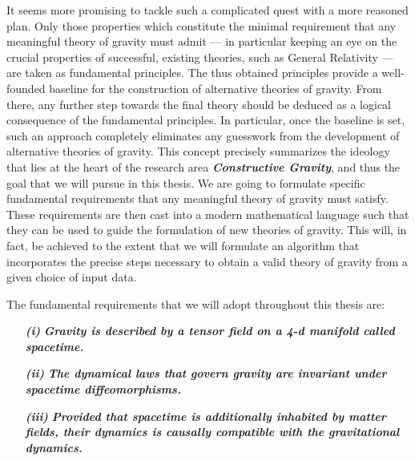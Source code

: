 It seems more promising to tackle such a complicated quest with a more reasoned plan. Only those properties which constitute the minimal requirement that any meaningful theory of gravity must admit --- in particular keeping an eye on the crucial properties of successful, existing theories, such as General Relativity --- are taken as fundamental principles. The thus obtained principles  provide a well-founded baseline for the construction of alternative theories of gravity. From there, any further step towards the final theory should be deduced as a logical consequence of the fundamental principles. In particular, once the baseline is set, such an approach completely eliminates any guesswork from the development of alternative theories of gravity. 
This concept precisely summarizes the ideology that lies at the heart of the research area \textit{\textbf{Constructive Gravity}}, and thus the goal that we will pursue in this thesis.
We are going to formulate specific fundamental requirements that any meaningful theory of gravity must satisfy. These requirements are then cast into a modern mathematical language such that they can be used to guide the formulation of new theories of gravity. This will, in fact, be achieved to the extent that we will formulate an algorithm that incorporates the precise steps necessary to obtain a valid theory of gravity from a given choice of input data. 

The fundamental requirements that we will adopt throughout this thesis are:
\begin{itemize}
    \item[\textbf{\textit{(i)}}] \textbf{\textit{Gravity is described by a tensor field on a 4-d manifold called spacetime.}}
    \item[\textbf{\textit{(ii)}}] \textbf{\textit{The dynamical laws that govern gravity are invariant under spacetime diffeomorphisms.}}
    \item[\textbf{\textit{(iii)}}] \textbf{\textit{Provided that spacetime is additionally inhabited by matter fields, their dynamics is causally compatible with the gravitational dynamics.}}
\end{itemize}

